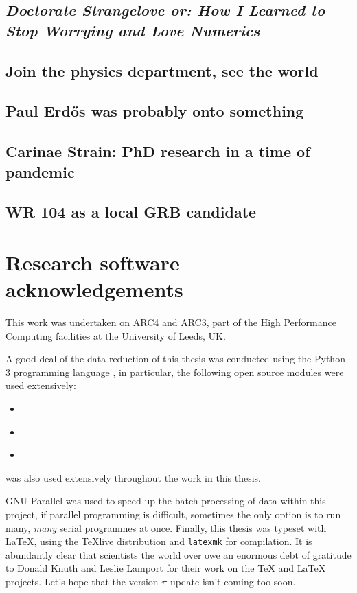 \subsection[\textit{How I Learned to Stop Worrying and Love Numerics}]{\textit{Doctorate Strangelove or: How I Learned to Stop Worrying and Love Numerics}} 

\subsection{Join the physics department, see the world}

\subsection{Paul Erd\H{o}s was probably onto something}

\subsection{Carinae Strain: PhD research in a time of pandemic}

\subsection{WR 104 as a local GRB candidate}

\section{Research software acknowledgements}

This work was undertaken on ARC4 and ARC3, part of the High Performance Computing facilities at the University of Leeds, UK.

A good deal of the data reduction of this thesis was conducted using the Python 3 programming language \parencite{10.5555/1593511}, in particular, the following open source modules were used extensively:

\begin{itemize}
  \item {} \parencite{harris2020array}
  \item {} \parencite{astropy:2013,astropy:2018}
  \item {} \parencite{Hunter:2007}
\end{itemize}

\athena{} \parencite{athena} was also used extensively throughout the work in this thesis.

GNU Parallel \parencite{tange_2021_5523272} was used to speed up the batch processing of data within this project, if parallel programming is difficult, sometimes the only option is to run many, \textit{many} serial programmes at once.
Finally, this thesis was typeset with \LaTeX{}, using the {\TeX}live distribution and \texttt{latexmk} for compilation.
It is abundantly clear that scientists the world over owe an enormous debt of gratitude to Donald Knuth and Leslie Lamport for their work on the \TeX{} and \LaTeX{} projects.
Let's hope that the version $\pi$ update isn't coming too soon.